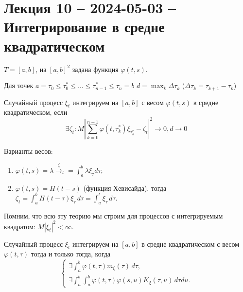 \section{Лекция 10 -- 2024-05-03 -- Интегрирование в средне квадратическом}

$T = [a, b]$, на $[a, b]^2$ задана функция $\varphi(t, s)$.

Для точек $a = \tau_0 \leqslant \tau_0^* \leqslant \dots \leqslant \tau_{n-1}^* \leqslant \tau_{n} = b$
$d = \max_k \Delta \tau_k$ ($\Delta \tau_k = \tau_{k+1} - \tau_k$)

\begin{definition}
  Случайный процесс $\xi_t$ интегрируем на $[a, b]$ с весом $\varphi(t, s)$ в средне квадратическом, 
  если
  \[
    \exists \zeta_t : M \left| \sum_{k=0}^{n-1} \varphi(t, \tau^*_k) \xi_{\tau_k^*} - \zeta_t \right|^2 \to 0, d \to 0
  \]
\end{definition}

Варианты весов:
\begin{enumerate}
  \item $\varphi(t, s) = \lambda \xrightarrow \zeta_t = \int_a^b \lambda \xi_\tau d\tau$;
  \item $\varphi(t, s) = H(t-s)$ (функция Хевисайда), тогда
    $\zeta_t = \int_a^b H(t-\tau) \xi_\tau \, d\tau = \int_a^t \xi_\tau \, d\tau$.
\end{enumerate}

Помним, что всю эту теорию мы строим для процессов с интегрируемым квадратом:
$M |\xi_t|^2 < \infty$.

\begin{theorem}
  Случайный процесс $\xi_t$ интегрируем на $[a, b]$ в средне квадратическом с весом $\varphi(t, \tau)$
  тогда и только тогда, когда
  \[
    \begin{cases}
      \exists \int_a^b \varphi(t, \tau) m_\xi(\tau) \, d\tau, \\
      \exists \int_a^b \int_a^b \varphi(t, \tau) \varphi(s, u) K_\xi(\tau, u) \, d\tau du.
    \end{cases}
  \]
\end{theorem}

